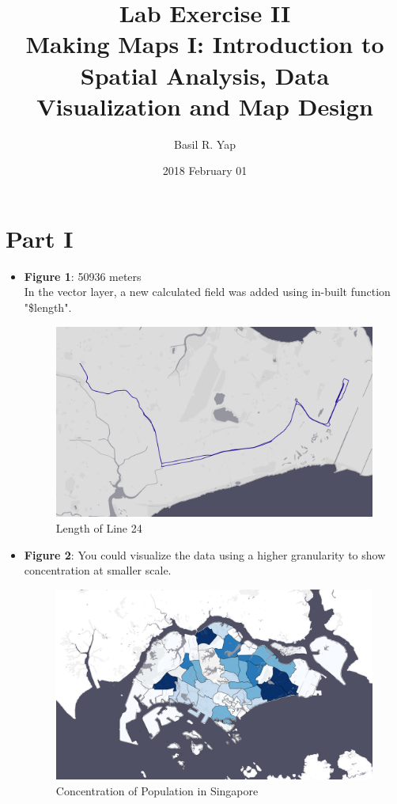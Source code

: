 \documentclass[a4paper, fleqn]{article}
\begin{document}
\title{Lab Exercise II \\ Making Maps I: Introduction to Spatial Analysis, Data Visualization and Map Design}
\author{Basil R. Yap}
\date{2018 February 01}
\maketitle

\section{Part I}

\begin{itemize}
\item \textbf{Figure 1}: 50936 meters\\
In the vector layer, a new calculated field was added using in-built function "\$length".\\
\begin{figure}[h!]
\includegraphics[width=\linewidth]{./assets/201802071736.png}
\caption{Length of Line 24}
\label{figure:map1}
\end{figure}
\pagebreak
\item \textbf{Figure 2}: You could visualize the data using a higher granularity to show concentration at smaller scale.\\
\begin{figure}[h!]
\includegraphics[width=\linewidth]{./assets/201802071800.png}
\caption{Concentration of Population in Singapore}
\label{figure:map2}
\end{figure}
\end{itemize}
\pagebreak
\end{document}
